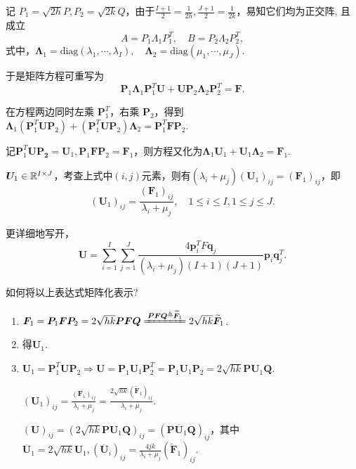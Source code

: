 记 $P_1 = \sqrt{2h}P, P_2 = \sqrt{2k}Q$，由于$\frac{I+1}{2}=\frac{1}{2h},\frac{J+1}{2}=\frac{1}{2k}$，易知它们均为正交阵, 且成立
\[ A = P_1 \Lambda_1 P_1^T, \quad B = P_2 \Lambda_2 P_2^T, \]
式中，$\bm{\Lambda}_1 = \mathrm{diag}(\lambda_1, \cdots, \lambda_I), \quad \bm{\Lambda}_2 = \mathrm{diag}(\mu_1, \cdots, \mu_J)$.\par
于是矩阵方程可重写为
\[ \bm{P}_1 \bm{\Lambda}_1 \bm{P}_1^T \bm{U} + \bm{U} \bm{P}_2 \bm{\Lambda}_2 \bm{P}_2^T = \bm{F}.\]\par
在方程两边同时左乘 $\bm{P}_1^T$，右乘 $\bm{P}_2$，得到$\bm{\Lambda}_1\left(\bm{P}_1^T\bm{U}\bm{P}_2\right)+\left(\bm{P}_1^T\bm{U}\bm{P}_2\right)\bm{\Lambda}_2=\bm{P}_1^T \bm{F} \bm{P}_2$.\par
记$\bm{P}_1^T\bm{U}\bm{P_2}=\bm{U}_1,\bm{P}_1\bm{F}\bm{P}_2=\bm{F}_1$，则方程又化为$\bm{\Lambda}_1\bm{U}_1+\bm{U}_1\bm{\Lambda}_2=\bm{F}_1$.\par
$\bm{U}_1\in\mathbb{R}^{I\times J}$，考查上式中$(i,j)$元素，则有$\left(\lambda_i+\mu_j\right)\left(\bm{U}_1\right)_{ij} = \left(\bm{F}_1\right)_{ij}$，即
\begin{equation}
    \left(\bm{U}_1\right)_{ij} = \frac{\left(\bm{F}_1\right)_{ij}}{\lambda_i + \mu_j}, \quad 1 \leq i \leq I, 1 \leq j \leq J.
\end{equation}\par
更详细地写开，
\begin{equation}
    \bm{U} = \sum_{i=1}^I \sum_{j=1}^J \frac{4\bm{p}_i^T F \bm{q}_j}{(\lambda_i + \mu_j)(I+1)(J+1)} \bm{p}_i \bm{q}_j^T.
\end{equation}

\begin{question}
    如何将以上表达式矩阵化表示?
\end{question}
\begin{enumerate}[label=(\arabic*)]
    \item $\bm{F}_1=\bm{P}_1\bm{F}\bm{P}_2=2\sqrt{hk}\bm{PFQ}\xlongequal{\bm{PFQ}\triangleq \bm{\widetilde{F}}_1}2\sqrt{hk}\widetilde{\bm{F}}_1$.
    \item 得$\bm{U}_1$.
    \item $\bm{U}_1=\bm{P}_1^T\bm{U}\bm{P}_2\Rightarrow \bm{U}=\bm{P}_1\bm{U}_1\bm{P}_2^T=\bm{P}_1\bm{U}_1\bm{P}_2=2\sqrt{hk}\bm{PU}_1\bm{Q}$.\par
    $\left(\bm{U}_1\right)_{ij}=\frac{\left(\bm{F}_{1}\right)_{ij}}{\lambda_i + \mu_j}=\frac{2\sqrt{hk}\left(\widetilde{\bm{F}}_1\right)_{ij}}{\lambda_i + \mu_j}$.\par
    $\left(\bm{U}\right)_{ij}=\left(2\sqrt{hk}\bm{P}\bm{U}_1\bm{Q}\right)_{ij}=\left(\bm{P}\overline{\bm{U}}_1\bm{Q}\right)_{ij}$，其中$\overline{\bm{U}}_1=2\sqrt{hk}\bm{U}_1,\left(\overline{\bm{U}}_i\right)_{ij}=\frac{4jk}{\lambda_i+\mu_j}\left(\widetilde{\bm{F}}_1\right)_{ij}$.
\end{enumerate}



